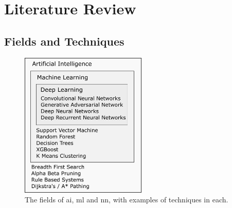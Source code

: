 \chapter{Literature Review}



\section*{Fields and Techniques}

\begin{figure}
    \centering
    \includegraphics[width=60mm]{figs/ai_ml_dl.png}
    \caption{The fields of \gls{ai}, \gls{ml} and \gls{nn}, with examples of techniques in each.}
    \label{fig:ai_ml_dl} 
\end{figure}


